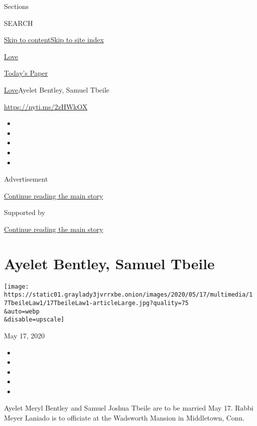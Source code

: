 Sections

SEARCH

\protect\hyperlink{site-content}{Skip to
content}\protect\hyperlink{site-index}{Skip to site index}

\href{https://www.nytimes3xbfgragh.onion/section/fashion/weddings}{Love}

\href{https://myaccount.nytimes3xbfgragh.onion/auth/login?response_type=cookie\&client_id=vi}{}

\href{https://www.nytimes3xbfgragh.onion/section/todayspaper}{Today's
Paper}

\href{/section/fashion/weddings}{Love}\textbar{}Ayelet Bentley, Samuel
Tbeile

\url{https://nyti.ms/2zHWkOX}

\begin{itemize}
\item
\item
\item
\item
\item
\end{itemize}

Advertisement

\protect\hyperlink{after-top}{Continue reading the main story}

Supported by

\protect\hyperlink{after-sponsor}{Continue reading the main story}

\hypertarget{ayelet-bentley-samuel-tbeile}{%
\section{Ayelet Bentley, Samuel
Tbeile}\label{ayelet-bentley-samuel-tbeile}}

\texttt{[image: https://static01.graylady3jvrrxbe.onion/images/2020/05/17/multimedia/17TbeileLaw1/17TbeileLaw1-articleLarge.jpg?quality=75\\\&auto=webp\\\&disable=upscale]}

May 17, 2020

\begin{itemize}
\item
\item
\item
\item
\item
\end{itemize}

Ayelet Meryl Bentley and Samuel Joshua Tbeile are to be married May 17.
Rabbi Meyer Laniado is to officiate at the Wadsworth Mansion in
Middletown, Conn.


